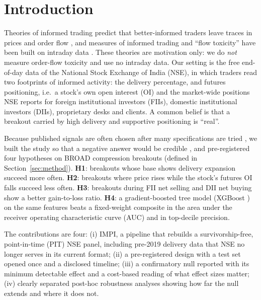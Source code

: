 \documentclass[conference]{IEEEtran}
\begin{document}
\section{Introduction}
Theories of informed trading predict that better-informed traders leave traces in prices and order flow
\cite{kyle1985,glosten1985}, and measures of informed trading and ``flow toxicity'' have been built on
intraday data \cite{easley1996,easley2012}. These theories are motivation only: we do \emph{not} measure
order-flow toxicity and use no intraday data. Our setting is the free end-of-day data of the National Stock
Exchange of India (NSE), in which traders read two footprints of informed activity: the delivery percentage,
and futures positioning, i.e.\ a stock's own open interest (OI) and the market-wide positions NSE reports for
foreign institutional investors (FIIs), domestic institutional investors (DIIs), proprietary desks and
clients. A common belief is that a breakout carried by high delivery and supportive positioning is ``real''.

Because published signals are often chosen after many specifications are tried \cite{harvey2016,bailey2014pseudo},
we built the study so that a negative answer would be credible \cite{nosek2018}, and pre-registered four
hypotheses on BROAD compression breakouts (defined in Section~\ref{sec:method}). \textbf{H1}: breakouts whose
base shows delivery expansion succeed more often. \textbf{H2}: breakouts where price rises while the stock's
futures OI falls succeed less often. \textbf{H3}: breakouts during FII net selling and DII net buying show a
better gain-to-loss ratio. \textbf{H4}: a gradient-boosted tree model (XGBoost \cite{chen2016}) on the same
features beats a fixed-weight composite in the area under the receiver operating characteristic curve (AUC)
and in top-decile precision.

The contributions are four: (i) IMPI, a pipeline that rebuilds a survivorship-free, point-in-time (PIT)
NSE panel, including pre-2019 delivery data that NSE no longer serves in its current format; (ii) a
pre-registered design with a test set opened once and a disclosed timeline; (iii) a confirmatory null
reported with its minimum detectable effect and a cost-based reading of what effect sizes matter; (iv) clearly
separated post-hoc robustness analyses showing how far the null extends and where it does not.
\end{document}
